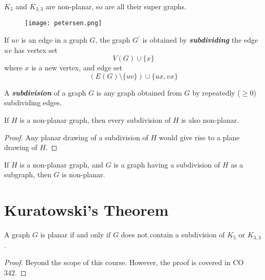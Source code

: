 $ K_5 $ and $ K_{3,3} $ are non-planar, so are all their super graphs.

\begin{figure}[H]
    \centering
    \texttt{[image: petersen.png]}
\end{figure}

\begin{defbox}
    \begin{definition}
        If $ uv $ is an edge in a graph $ G $, the graph $ G^{\prime} $
        is obtained by \textbf{\emph{subdividing}} the edge $ uv $
        has vertex set
        \[ V(G)\cup \{x\} \]
        where $ x $ is a new vertex, and edge set
        \[ (E(G)\setminus \{uv\})\cup \{ux,vx\} \]
    \end{definition}
\end{defbox}

\begin{defbox}
    \begin{definition}
        A \textbf{\emph{subdivision}} of a graph $ G $ is any graph
        obtained from $ G $ by repeatedly ($ \geqslant 0 $) subdividing edges.
    \end{definition}
\end{defbox}

\begin{thmbox}
    \begin{prop}
        If $ H $ is a non-planar graph, then every subdivision of $ H $
        is also non-planar.
    \end{prop}
\end{thmbox}
\begin{proof}
    Any planar drawing of a subdivision of $ H $ would give rise to
    a plane drawing of $ H $.
\end{proof}

\begin{thmbox}
    \begin{corollary}
        If $ H $ is a non-planar graph, and $ G $ is a graph
        having a subdivision of $ H $ as a subgraph, then $ G $
        is non-planar.
    \end{corollary}
\end{thmbox}

\section{Kuratowski's Theorem}
\begin{thmbox}
    \begin{theorem}
        A graph $ G $ is planar if and only if $ G $ does not
        contain a subdivision of $ K_5 $ or $ K_{3,3} $.
    \end{theorem}
\end{thmbox}
\begin{proof}
    Beyond the scope of this course. However, the proof is covered in
    CO 342.
\end{proof}


